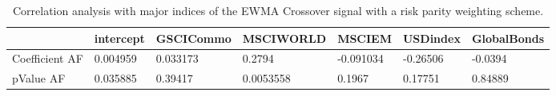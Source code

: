 \begin{table}[H]
\centering
\begin{tabular}{lllllll}
& intercept & GSCICommo & MSCIWORLD & MSCIEM & USDindex & GlobalBonds \\ 
\hline 
Coefficient AF & 0.004959 & 0.033173 & 0.2794 & -0.091034 & -0.26506 & -0.0394 \\ 
pValue AF & 0.035885 & 0.39417 & 0.0053558 & 0.1967 & 0.17751 & 0.84889 \\ 
\hline
\end{tabular}
\caption{Correlation analysis with major indices of the EWMA Crossover signal with a risk parity weighting scheme.}
\label{MBBSRPOQ_AFACTOR}
\end{table}